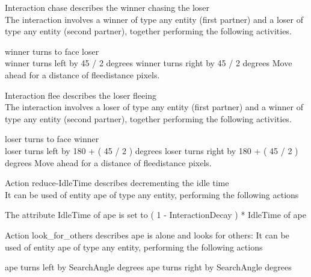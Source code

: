 \documentclass{article}
\begin{document}
\parbox{\linewidth}{
Interaction {\color{purple}chase} describes the winner chasing the loser\\
The interaction involves a {\color{orange}winner} of type any entity (first partner) and a {\color{orange}loser} of type any entity (second partner), together performing the following activities.\\
\begin{algorithm}[H]
  {\color{orange}winner}  turns to face  {\color{orange}loser}\\
    {
        {\color{orange}winner}  turns  left  by  45 / 2  degrees
    }
    {
        {\color{orange}winner}  turns  right  by  45 / 2  degrees
    }
  Move ahead for a distance of {\color{blue}fleedistance}
  pixels.
\end{algorithm}
\hline
}

\parbox{\linewidth}{
Interaction {\color{purple}flee} describes the loser fleeing\\
The interaction involves a {\color{orange}loser} of type any entity (first partner) and a {\color{orange}winner} of type any entity (second partner), together performing the following activities.\\
\begin{algorithm}[H]
    {\color{orange}loser}  turns to face  winner\\
  {
    {\color{orange}loser}  turns  left  by  180 + ( 45 / 2 )  degrees
  }
  {
    {\color{orange}loser}  turns  right  by  180 + ( 45 / 2 )  degrees
  }
  Move ahead for a distance of {\color{blue}fleedistance} pixels.
\end{algorithm}
\hline
}

\parbox{\linewidth}{
Action {\color{purple}reduce-IdleTime} describes decrementing the idle time\\
It can be used of entity {\color{orange}ape} of type any entity, performing the following actions\\
\begin{algorithm}[H]
The attribute {\color{blue}IdleTime} of  {\color{orange}ape} is set to ( 1 - {\color{blue}InteractionDecay} ) * {\color{blue}IdleTime} of  {\color{orange}ape}
\end{algorithm}                                                  
Action {\color{purple}look\_for\_others} describes ape is alone and looks for others:
It can be used of entity {\color{orange}ape} of type any entity, performing the following actions
\begin{algorithm}[H]
{
{\color{orange}ape}  turns  left  by  {\color{blue}SearchAngle}  degrees 
}
{
    {\color{orange}ape}  turns  right  by  {\color{blue}SearchAngle}  degrees
}
\end{algorithm}
\hline
}
\end{document}
